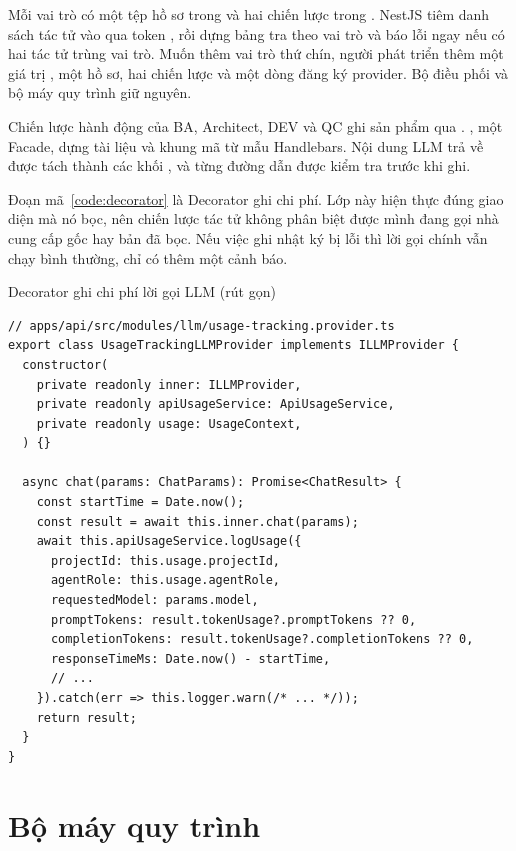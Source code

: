 Mỗi vai trò có một tệp hồ sơ trong  và hai chiến lược trong . NestJS tiêm danh sách tác tử vào qua token , rồi  dựng bảng tra theo vai trò và báo lỗi ngay nếu có hai tác tử trùng vai trò. Muốn thêm vai trò thứ chín, người phát triển thêm một giá trị , một hồ sơ, hai chiến lược và một dòng đăng ký provider. Bộ điều phối và bộ máy quy trình giữ nguyên.

Chiến lược hành động của BA, Architect, DEV và QC ghi sản phẩm qua . , một Facade, dựng tài liệu và khung mã từ mẫu Handlebars. Nội dung LLM trả về được tách thành các khối , và từng đường dẫn được kiểm tra trước khi ghi.

Đoạn mã~\ref{code:decorator} là Decorator ghi chi phí. Lớp này hiện thực đúng giao diện  mà nó bọc, nên chiến lược tác tử không phân biệt được mình đang gọi nhà cung cấp gốc hay bản đã bọc. Nếu việc ghi nhật ký bị lỗi thì lời gọi chính vẫn chạy bình thường, chỉ có thêm một cảnh báo.

\begin{codelisting}{Decorator ghi chi phí lời gọi LLM (rút gọn)}
\label{code:decorator}
\begin{Verbatim}
// apps/api/src/modules/llm/usage-tracking.provider.ts
export class UsageTrackingLLMProvider implements ILLMProvider {
  constructor(
    private readonly inner: ILLMProvider,
    private readonly apiUsageService: ApiUsageService,
    private readonly usage: UsageContext,
  ) {}

  async chat(params: ChatParams): Promise<ChatResult> {
    const startTime = Date.now();
    const result = await this.inner.chat(params);
    await this.apiUsageService.logUsage({
      projectId: this.usage.projectId,
      agentRole: this.usage.agentRole,
      requestedModel: params.model,
      promptTokens: result.tokenUsage?.promptTokens ?? 0,
      completionTokens: result.tokenUsage?.completionTokens ?? 0,
      responseTimeMs: Date.now() - startTime,
      // ...
    }).catch(err => this.logger.warn(/* ... */));
    return result;
  }
}
\end{Verbatim}
\end{codelisting}

\section{Bộ máy quy trình}

